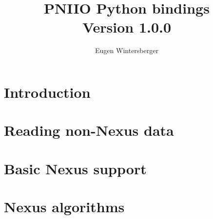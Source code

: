 \documentclass{scrbook}
\title{{\Huge PNIIO Python bindings}\\
       Version 1.0.0}
\author{Eugen Wintersberger}
\begin{document}
\maketitle
\tableofcontents

\chapter{Introduction}


\chapter{Reading non-Nexus data}

\chapter{Basic Nexus support}


\chapter{Nexus algorithms}
\end{document}
